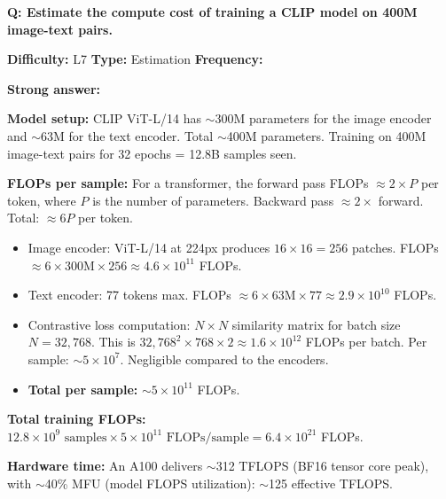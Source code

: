 \begin{interviewq}
\textbf{Q: Estimate the compute cost of training a CLIP model on 400M image-text pairs.}

\textbf{Difficulty:} L7 \quad \textbf{Type:} Estimation \quad \textbf{Frequency:} \freqlow{}

\textbf{Strong answer:}

\textbf{Model setup:} CLIP ViT-L/14 has $\sim$300M parameters for the image encoder and $\sim$63M for the text encoder. Total $\sim$400M parameters. Training on 400M image-text pairs for 32 epochs = 12.8B samples seen.

\textbf{FLOPs per sample:} For a transformer, the forward pass FLOPs $\approx 2 \times P$ per token, where $P$ is the number of parameters. Backward pass $\approx 2\times$ forward. Total: $\approx 6P$ per token.
\begin{itemize}
    \item Image encoder: ViT-L/14 at 224px produces $16 \times 16 = 256$ patches. FLOPs $\approx 6 \times 300\text{M} \times 256 \approx 4.6 \times 10^{11}$ FLOPs.
    \item Text encoder: 77 tokens max. FLOPs $\approx 6 \times 63\text{M} \times 77 \approx 2.9 \times 10^{10}$ FLOPs.
    \item Contrastive loss computation: $N \times N$ similarity matrix for batch size $N = 32{,}768$. This is $32{,}768^2 \times 768 \times 2 \approx 1.6 \times 10^{12}$ FLOPs per batch. Per sample: $\sim 5 \times 10^7$. Negligible compared to the encoders.
    \item \textbf{Total per sample:} $\sim 5 \times 10^{11}$ FLOPs.
\end{itemize}

\textbf{Total training FLOPs:} $12.8 \times 10^9 \text{ samples} \times 5 \times 10^{11} \text{ FLOPs/sample} = 6.4 \times 10^{21}$ FLOPs.

\textbf{Hardware time:} An A100 delivers $\sim$312 TFLOPS (BF16 tensor core peak), with $\sim$40\% MFU (model FLOPS utilization): $\sim$125 effective TFLOPS.


\end{interviewq}
